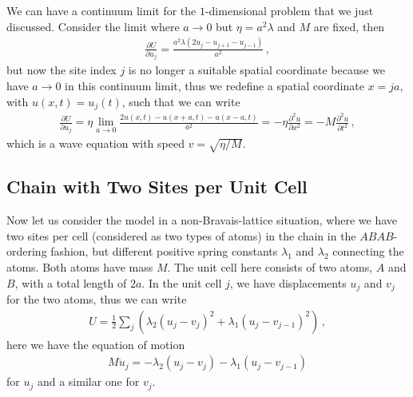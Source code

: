 \documentclass[11pt, oneside]{book}
\theoremstyle{break}
\theoremstyle{break}
\newcommand{\pd}{\partial}
\begin{document}
We can have a continuum limit for the $1$-dimensional problem that we just discussed. Consider the limit where $a\to 0$ but $\eta = a^2\lambda$ and $M$ are fixed, then 
\begin{align*}
\frac{\pd U}{\pd u_j} = \frac{a^2 \lambda ( 2u_j - u_{j+1} - u_{j-1})}{a^2}\,,
\end{align*}
but now the site index $j$ is no longer a suitable spatial coordinate because we have $a \to 0$ in this continuum limit, thus we redefine a spatial coordinate $x = ja$, with $u(x,t)=u_j(t)$, such that we can write 
\begin{align*}
\frac{\pd U}{\pd u_j} = \eta \lim_{a \to 0} \frac{2u(x,t) - u(x+a,t) - u(x-a,t)}{a^2} = -\eta \frac{\pd^2 u}{\pd x^2} = -M \frac{\pd^2 u}{\pd t^2}\,,
\end{align*}
which is a wave equation with speed $v = \sqrt{\eta / M}$. \\

\subsection{Chain with Two Sites per Unit Cell}
Now let us consider the model in a non-Bravais-lattice situation, where we have two sites per cell (considered as two types of atoms) in the chain in the $ABAB$-ordering fashion, but different positive spring constants $\lambda_1$ and $\lambda_2$ connecting the atoms. Both atoms have mass $M$. The unit cell here consists of two atoms, $A$ and $B$, with a total length of $2a$. In the unit cell $j$, we have displacements $u_j$ and $v_j$ for the two atoms, thus we can write
\begin{align*}
U = \frac{1}{2}\sum_j \left(\lambda_2(u_j -v_j)^2 + \lambda_1 (u_j - v_{j-1})^2\right)\,,
\end{align*}
here we have the equation of motion 
\begin{align*}
M\ddot{u}_j = -\lambda_2 (u_j - v_j) - \lambda_1(u_j - v_{j-1})
\end{align*}
for $u_j$ and a similar one for $v_j$. \\
\end{document}
